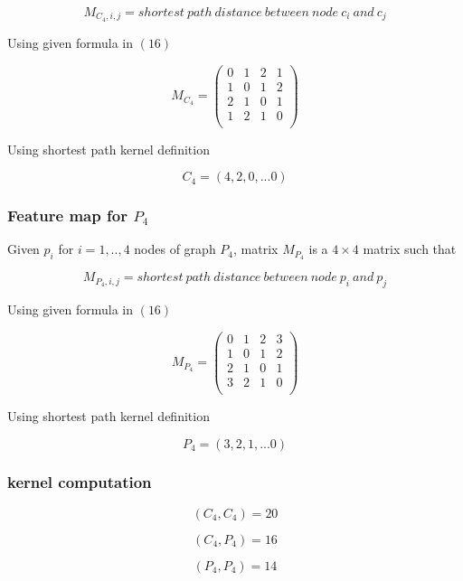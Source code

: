 \documentclass[a4paper]{article}
\begin{document}
\begin{equation}
M_{C_{4},i,j}= shortest\ path\ distance\ between\ node\ c_{i}\ and\ c_{j}
\end{equation}

Using given formula in $(16)$

\begin{equation}
M_{C_{4}}=
\begin{pmatrix}
0 & 1 & 2 & 1\\
1 & 0 & 1 & 2\\
2 & 1 & 0 & 1\\
1 & 2 & 1 & 0\\
\end{pmatrix}
\end{equation}


Using shortest path kernel definition

\begin{equation}
C_{4}=(4,2,0,...0)
\end{equation}

\subsubsection{Feature map for $P_{4}$}

Given $p_{i}$ for $i = 1,..,4$ nodes of graph $P_{4}$, matrix $M_{P_{4}}$ is a $ 4 \times 4$ matrix such that

\begin{equation}
M_{P_{4},i,j}= shortest\ path\ distance\ between\ node\ p_{i}\ and\ p_{j}
\end{equation}

Using given formula in $(16)$

\begin{equation}
M_{P_{4}}=
\begin{pmatrix}
0 & 1 & 2 & 3\\
1 & 0 & 1 & 2\\
2 & 1 & 0 & 1\\
3 & 2 & 1 & 0\\
\end{pmatrix}
\end{equation}


Using shortest path kernel definition

\begin{equation}
P_{4}=(3,2,1,...0)
\end{equation}


\subsubsection{kernel computation}
\begin{equation}
(C_{4},C_{4})= 20
\end{equation}

\begin{equation}
(C_{4},P_{4})= 16
\end{equation}

\begin{equation}
(P_{4},P_{4})= 14
\end{equation}


\end{document}
